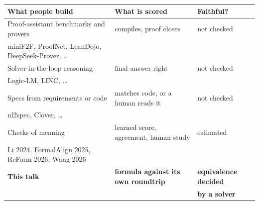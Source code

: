 \documentclass[border=8pt,12pt]{standalone}
\begin{document}
\renewcommand{\arraystretch}{1.15}
\begin{tabular}{@{}lll@{}}
\toprule
\textbf{What people build} & \textbf{What is scored} & \textbf{Faithful?} \\
\midrule
Proof-assistant benchmarks and provers & compiles, proof closes & \textcolor{black!60}{not checked} \\
\quad\textcolor{black!60}{miniF2F, ProofNet, LeanDojo, DeepSeek-Prover, \ldots} & & \\
Solver-in-the-loop reasoning & final answer right & \textcolor{black!60}{not checked} \\
\quad\textcolor{black!60}{Logic-LM, LINC, \ldots} & & \\
Specs from requirements or code & matches code, or a human reads it & \textcolor{black!60}{not checked} \\
\quad\textcolor{black!60}{nl2spec, Clover, \ldots} & & \\
Checks of meaning & learned score, agreement, human study & estimated \\
\quad\textcolor{black!60}{Li 2024, FormalAlign 2025, ReForm 2026, Wang 2026} & & \\
\addlinespace[3pt]
\textbf{This talk} & \textbf{formula against its own roundtrip} & \textbf{equivalence decided} \\
 & & \textbf{by a solver} \\
\bottomrule
\end{tabular}
\end{document}
